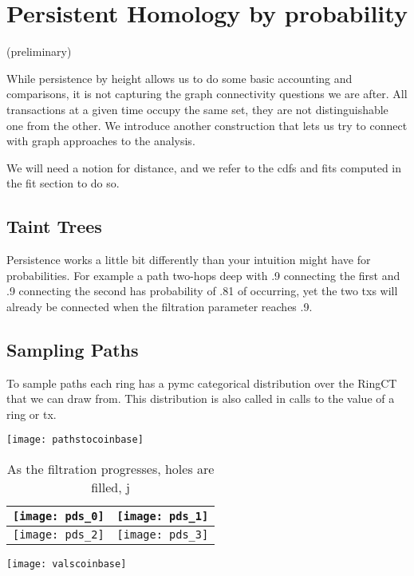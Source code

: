 \section{Persistent Homology by probability}

(preliminary)

While persistence by height allows us to do some basic accounting and comparisons, it is not capturing the graph connectivity questions we are after.  
All transactions at a given time occupy the same set, they are not distinguishable one from the other.
We introduce another construction that lets us try to connect with graph approaches to the analysis.

We will need a notion for distance, and we refer to the cdfs and fits computed in the fit section to do so.

\subsection{Taint Trees}

Persistence works a little bit differently than your intuition might have for probabilities.  
For example a path two-hops deep with .9 connecting the first and .9 connecting the second has probability of .81 of occurring, yet the two txs will already be connected when the filtration parameter reaches .9.  

\subsection{Sampling Paths}

To sample paths each ring has a pymc categorical distribution over the RingCT that we can draw from.  This distribution is also called in calls to the value of a ring or tx.

\texttt{[image: pathstocoinbase]} 

\begin{center}
\begin{table}
\begin{tabular}{|c|c|}

\hline
 \texttt{[image: pds\_0]} & \texttt{[image: pds\_1]}  \\ \hline
  \texttt{[image: pds\_2]} & \texttt{[image: pds\_3]}  \\ \hline
\end{tabular}
\caption{As the filtration progresses, holes are filled, j}
\end{table}
\end{center}

\texttt{[image: valscoinbase]} 